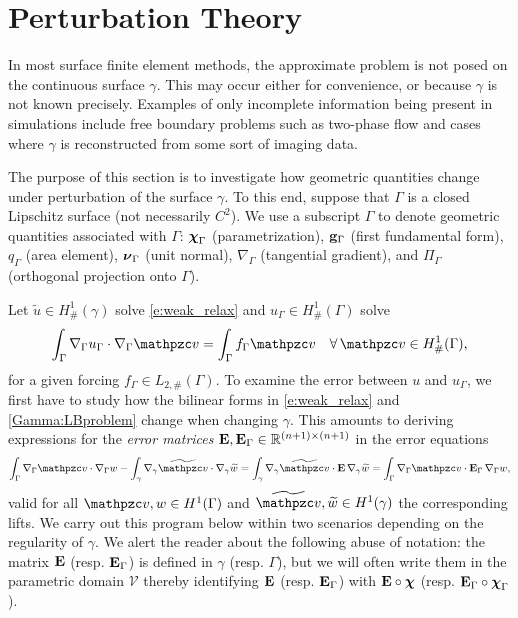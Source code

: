   
  
  
\section{Perturbation Theory}\label{S:perturbation}
%
In most surface finite element methods, the approximate problem is not posed on the continuous surface $\gamma$.  This may occur either for convenience, or because $\gamma$ is not known precisely. Examples of only incomplete information being present in simulations include free boundary problems such as two-phase flow and cases where $\gamma$ is reconstructed from some sort of imaging data. 

The purpose of this section is to investigate how geometric quantities change
under perturbation of the surface $\gamma$. To this end, suppose that
$\Gamma$ is a closed Lipschitz surface (not necessarily $C^2$). We use a subscript $\Gamma$
to denote geometric quantities associated with $\Gamma$:
${\boldsymbol \chi}_\Gamma$ (parametrization), ${\bf g}_\Gamma$
(first fundamental form), $q_\Gamma$ (area element), ${\boldsymbol \nu}_\Gamma$ (unit normal),
$\nabla_\Gamma$ (tangential gradient), and $\Pi_\Gamma$ (orthogonal projection
onto $\Gamma$).

Let $\widetilde u\in H^1_\#(\gamma)$ solve \eqref{e:weak_relax} and $u_\Gamma\in H^1_\#(\Gamma)$ solve
%
\begin{equation}\label{Gamma:LBproblem}
  \int_\Gamma \nabla_\Gamma u_\Gamma \cdot \nabla_\Gamma \tv = \int_\Gamma f_\Gamma \tv
  \quad\forall \, \tv\in H^1_\#(\Gamma),
\end{equation}  
%
for a given forcing $f_\Gamma\in L_{2,\#}(\Gamma)$.
To examine the error between $u$ and $u_\Gamma$, we first have to study how the bilinear
forms in \eqref{e:weak_relax} and \eqref{Gamma:LBproblem} change
when changing $\gamma$. This amounts to
deriving expressions for the {\it error matrices}
${\bf E},{\bf E}_\Gamma \in\mathbb{R}^{(n+1)\times(n+1)}$ in the error equations
%
\begin{equation}\label{consistency}
  \int_\Gamma \nabla_\Gamma \tv \cdot \nabla_\Gamma w
  - \int_\gamma \nabla_\gamma \widetilde{\tv} \cdot \nabla_\gamma \widetilde{w}
  = \int_\gamma \nabla_\gamma \widetilde{\tv} \cdot \bE \, \nabla_\gamma \widetilde{w}
  = \int_\Gamma \nabla_\Gamma \tv \cdot \bE_\Gamma \, \nabla_\Gamma w,
\end{equation}
%
valid for all $\tv,w \in H^1(\Gamma)$ and 
$\widetilde{\tv}, \widetilde{w} \in H^1(\gamma)$ the corresponding lifts.
We carry out this program below within two scenarios depending on the regularity
of $\gamma$. We alert the reader about the following abuse of notation:
the matrix ${\bf E}$ (resp. ${\bf E}_\Gamma$) is defined in $\gamma$ (resp. $\Gamma$),
but we will often write them in the parametric domain $\mathcal{V}$ thereby
identifying ${\bf E}$ (resp. ${\bf E}_\Gamma$) with ${\bf E}\circ{\boldsymbol \chi}$
(resp. ${\bf E}_\Gamma\circ{\boldsymbol \chi}_\Gamma$).

